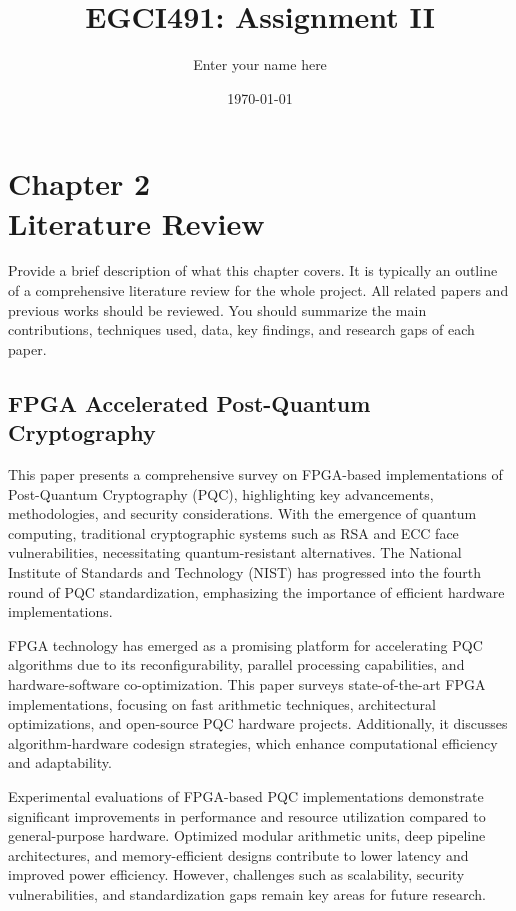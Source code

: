 \documentclass[a4paper, 12pt]{report}
\title{EGCI491: Assignment II}
\author{Enter your name here} %
\date{\today}
\begin{document}
	
	\maketitle
		
	\chapter*{\centering Chapter 2 \\  Literature Review}
	
	\hspace{\parindent} 
	Provide a brief description of what this chapter covers. It is typically an outline of a comprehensive literature review for the whole project.  All related papers and previous works should be reviewed. You should summarize the main contributions, techniques used, data, key findings, and research gaps of each paper.
		
	\setcounter{chapter}{2}
	\section{ FPGA Accelerated Post-Quantum Cryptography \cite{paper_1}}
	This paper presents a comprehensive survey on FPGA-based implementations of Post-Quantum Cryptography (PQC), highlighting key advancements, methodologies, and security considerations. With the emergence of quantum computing, traditional cryptographic systems such as RSA and ECC face vulnerabilities, necessitating quantum-resistant alternatives. The National Institute of Standards and Technology (NIST) has progressed into the fourth round of PQC standardization, emphasizing the importance of efficient hardware implementations.
	
	FPGA technology has emerged as a promising platform for accelerating PQC algorithms due to its reconfigurability, parallel processing capabilities, and hardware-software co-optimization. This paper surveys state-of-the-art FPGA implementations, focusing on fast arithmetic techniques, architectural optimizations, and open-source PQC hardware projects. Additionally, it discusses algorithm-hardware codesign strategies, which enhance computational efficiency and adaptability.
	
	Experimental evaluations of FPGA-based PQC implementations demonstrate significant improvements in performance and resource utilization compared to general-purpose hardware. Optimized modular arithmetic units, deep pipeline architectures, and memory-efficient designs contribute to lower latency and improved power efficiency. However, challenges such as scalability, security vulnerabilities, and standardization gaps remain key areas for future research.
	
\end{document}
